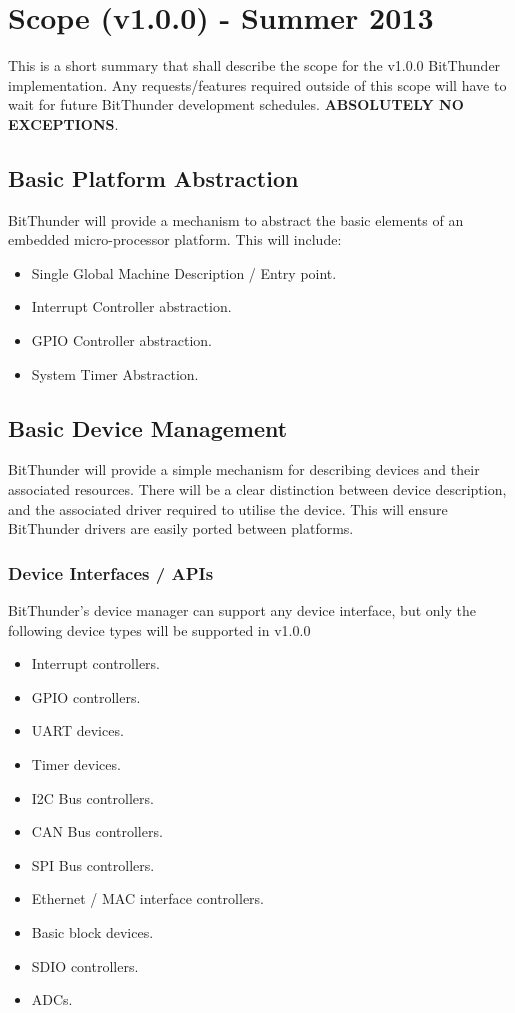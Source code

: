 \section{Scope (v1.0.0) - Summer 2013}
This is a short summary that shall describe the scope for the v1.0.0 BitThunder implementation.
Any requests/features required outside of this scope will have to wait for future BitThunder development
schedules. \textbf{ABSOLUTELY NO EXCEPTIONS}.

\subsection{Basic Platform Abstraction}
BitThunder will provide a mechanism to abstract the basic elements of an embedded micro-processor platform.
This will include:

\begin{itemize}
\item Single Global Machine Description / Entry point.
\item Interrupt Controller abstraction.
\item GPIO Controller abstraction.
\item System Timer Abstraction.
\end{itemize}

\subsection{Basic Device Management}
BitThunder will provide a simple mechanism for describing devices and their associated resources.
There will be a clear distinction between device description, and the associated driver required
to utilise the device. This will ensure BitThunder drivers are easily ported between platforms.

\subsubsection{Device Interfaces / APIs}
BitThunder's device manager can support any device interface, but only the following device types
will be supported in v1.0.0

\begin{itemize}
\item Interrupt controllers.
\item GPIO controllers.
\item UART devices.
\item Timer devices.
\item I2C Bus controllers.
\item CAN Bus controllers.
\item SPI Bus controllers.
\item Ethernet / MAC interface controllers.
\item Basic block devices.
\item SDIO controllers.
\item ADCs.
\end{itemize}

